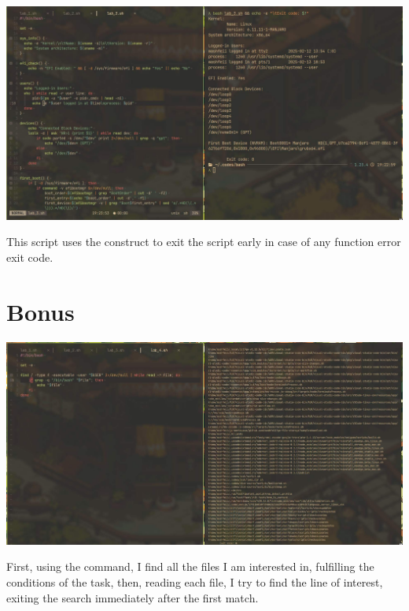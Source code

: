 \documentclass{article}
\begin{document}
\includegraphics[width=460pt]{4_3.jpg}
\newline

This script uses the  construct to exit the script early in case of any function error exit code.

\section{Bonus}
\noindent

\includegraphics[width=460pt]{4_4.jpg}
\newline

First, using the  command, I find all the files I am interested in, fulfilling the conditions of the task, then, reading each file, I try to find the line of interest, exiting the search immediately after the first match.
\end{document}
